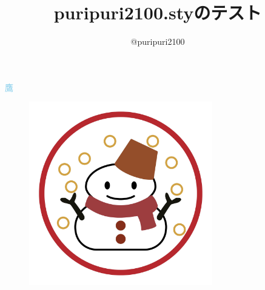 \documentclass{ltjsarticle}
\begin{document}
\title{\textsf{puripuri2100.sty}のテスト}
\author{@puripuri2100}
\date{\puritoday}
\maketitle

\textcolor{SkyBlue}{鷹}
\begin{figure}[h]
\centering
\includegraphics[width=80mm]{aki.jpg}
\end{figure}
\end{document}
